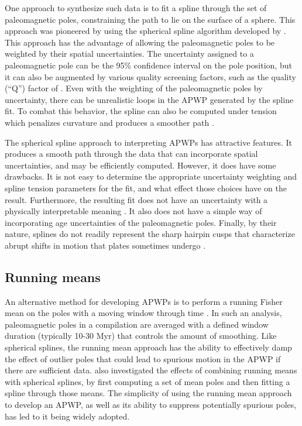 \documentclass[]{agujournal2019}
\begin{document}
One approach to synthesize such data is to fit a spline through the set of paleomagnetic poles, constraining the path to lie on the surface of a sphere. This approach was pioneered by  using the spherical spline algorithm developed by . This approach has the advantage of allowing the paleomagnetic poles to be weighted by their spatial uncertainties. The uncertainty assigned to a paleomagnetic pole can be the 95\% confidence interval on the pole position, but it can also be augmented by various quality screening factors, such as the quality (``Q'') factor of  \cite{Torsvik1992a}. Even with the weighting of the paleomagnetic poles by uncertainty, there can be unrealistic loops in the APWP generated by the spline fit. To combat this behavior, the spline can also be computed under tension which penalizes curvature and produces a smoother path \cite{Torsvik1996a}.

The spherical spline approach to interpreting APWPs has attractive features. It produces a smooth path through the data that can incorporate spatial uncertainties, and may be efficiently computed. However, it does have some drawbacks. It is not easy to determine the appropriate uncertainty weighting and spline tension parameters for the fit, and what effect those choices have on the result. Furthermore, the resulting fit does not have an uncertainty with a physically interpretable meaning \cite{Torsvik1996a}. It also does not have a simple way of incorporating age uncertainties of the paleomagnetic poles. Finally, by their nature, splines do not readily represent the sharp hairpin cusps that characterize abrupt shifts in motion that plates sometimes undergo \cite{Irving1972a, Gordon1984a, Torsvik2012a}.

\subsection*{Running means}

An alternative method for developing APWPs is to perform a running Fisher mean on the poles with a moving window through time \cite{Irving1977a, Van-der-Voo2001a, Torsvik2008a}. In such an analysis, paleomagnetic poles in a compilation are averaged with a defined window duration (typically 10-30 Myr) that controls the amount of smoothing. Like spherical splines, the running mean approach has the ability to effectively damp the effect of outlier poles that could lead to spurious motion in the APWP if there are sufficient data.  also investigated the effects of combining running means with spherical splines, by first computing a set of mean poles and then fitting a spline through those means. The simplicity of using the running mean approach to develop an APWP, as well as its ability to suppress potentially spurious poles, has led to it being widely adopted.
\end{document}
